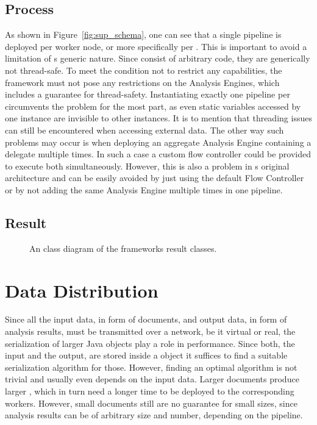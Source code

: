\subsection{Process}
As shown in Figure~\ref{fig:sup_schema}, one can see that a single pipeline is deployed per worker node, or more specifically per \jvm{}. This is important to avoid a limitation of \uima{}s generic nature. Since \anens{} consist of arbitrary code, they are generically not thread-safe. To meet the condition not to restrict any \uima{} capabilities, the framework must not pose any restrictions on the Analysis Engines, which includes a guarantee for thread-safety. Instantiating exactly one pipeline per \jvm{} circumvents the problem for the most part, as even static variables accessed by one instance are invisible to other instances. It is to mention that threading issues can still be encountered when accessing external data. The other way such problems may occur is when deploying an aggregate Analysis Engine containing a delegate \anen{} multiple times. In such a case a custom flow controller could be provided to execute both \anens{} simultaneously. However, this is also a problem in \uima{}s original architecture and can be easily avoided by just using the default Flow Controller or by not adding the same Analysis Engine multiple times in one pipeline.

\subsection{Result}


\begin{figure}[htb]
	\centering
	\resizebox{\linewidth}{!}{\footnotesize}
	\caption[An UML class diagram of the frameworks result classes.]{An \uml{} class diagram of the frameworks result classes.}
	\label{fig:sup_results}
\end{figure}



\section{Data Distribution}
\label{sec:distribution}
Since all the input data, in form of documents, and output data, in form of analysis results, must be transmitted over a network, be it virtual or real, the serialization of larger Java objects play a role in performance. Since both, the input and the output, are stored inside a \cas{} object it suffices to find a suitable serialization algorithm for those. However, finding an optimal algorithm is not trivial and usually even depends on the input data. Larger documents produce larger \cas{}, which in turn need a longer time to be deployed to the corresponding \spark{} workers. However, small documents still are no guarantee for small \cas{} sizes, since analysis results can be of arbitrary size and number, depending on the \uima{} pipeline. 

